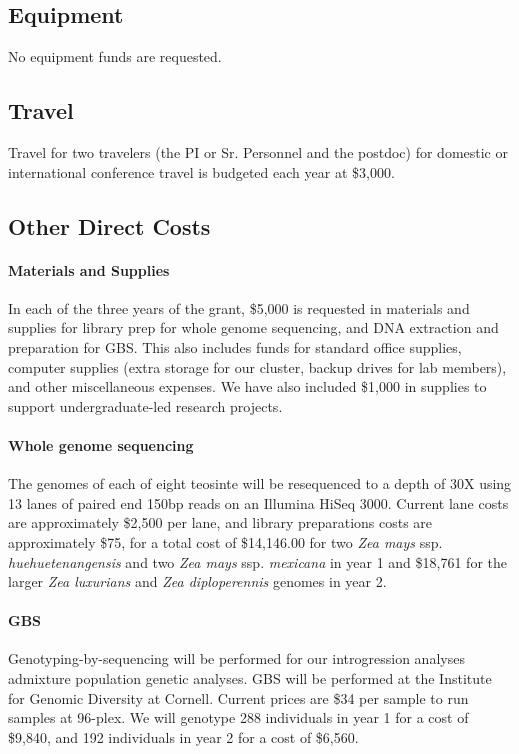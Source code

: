 \documentclass[11pt,letterpaper]{article}
\begin{document}
\subsection*{Equipment}

No equipment funds are requested.

\subsection*{Travel}

Travel for two travelers (the PI or Sr. Personnel and the postdoc) for domestic or international conference travel is budgeted each year at \$3,000. 

\subsection*{Other Direct Costs}

 \paragraph{Materials and Supplies}
In each of the three years of the grant, \$5,000 is requested in materials and supplies for library prep for whole genome sequencing, and DNA extraction and preparation for GBS.  This also includes funds for standard office supplies, computer supplies (extra storage for our cluster, backup drives for lab members), and other miscellaneous expenses. We have also included \$1,000 in supplies to support undergraduate-led research projects.

\paragraph{Whole genome sequencing}
The genomes of each of eight teosinte will be resequenced to a depth of 30X using 13 lanes of paired end 150bp reads on an Illumina HiSeq 3000. Current lane costs are approximately \$2,500 per lane, and library preparations costs are approximately \$75, for a total cost of \$14,146.00 for two \emph{Zea mays} ssp. \emph{huehuetenangensis} and two \emph{Zea mays} ssp. \emph{mexicana} in year 1 and \$18,761 for the larger \emph{Zea luxurians} and \emph{Zea diploperennis} genomes in year 2.

\paragraph{GBS}
Genotyping-by-sequencing will be performed for our introgression analyses admixture population genetic analyses. GBS will be performed at the Institute for Genomic Diversity at Cornell.  Current prices are \$34 per sample to run samples at 96-plex.  We will genotype 288 individuals in year 1 for a cost of \$9,840, and 192 individuals in year 2 for a cost of \$6,560. 
\end{document}
